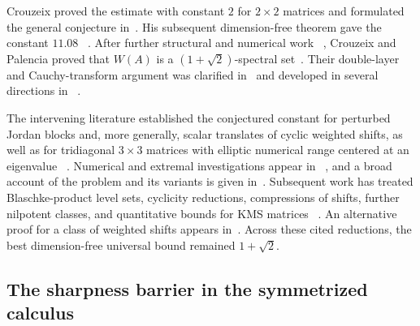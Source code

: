 \documentclass[preprints,article,submit,oneauthor]{Definitions/mdpi}
\theoremstyle{mdpi}
\theoremstyle{definition}
\begin{document}
Crouzeix proved the estimate with constant $2$ for $2\times2$ matrices and
formulated the general conjecture in~\cite{Crouzeix2004}.  His
subsequent dimension-free theorem gave the constant $11.08$~%
\cite{Crouzeix2007}.  After further structural and numerical work~%
\cite{Crouzeix2016}, Crouzeix and Palencia proved that $W(A)$ is a
$(1+\sqrt2)$-spectral set~\cite{CrouzeixPalencia2017}.  Their
double-layer and Cauchy-transform argument was clarified in~%
\cite{RansfordSchwenninger2018} and developed in several directions in~%
\cite{CaldwellGreenbaumLi2018,CrouzeixGreenbaum2019}.

The intervening literature established the conjectured constant for
perturbed Jordan blocks and, more generally, scalar translates of
cyclic weighted shifts, as well as for tridiagonal $3\times3$ matrices
with elliptic numerical range centered at an eigenvalue~%
\cite{ChoiGreenbaum2012,Choi2013,GladerKurulaLindstrom2018}.
Numerical and extremal investigations appear in~%
\cite{GreenbaumOverton2018,Li2020}, and a broad account of the problem
and its variants is given in~\cite{BickelEtAl2020}.  Subsequent work
has treated Blaschke-product level sets, cyclicity reductions,
compressions of shifts, further nilpotent classes, and quantitative
bounds for KMS matrices~%
\cite{BickelGorkin2024,OLoughlinVirtanen2024,BickelEtAl2024,
CrouzeixGreenbaumLi2024}.  An alternative proof for a class of weighted shifts
appears in~\cite{CrouzeixGreenbaum2025}.  Across these cited
reductions, the best dimension-free universal bound remained
$1+\sqrt2$.

\subsection{The sharpness barrier in the symmetrized calculus}
\end{document}
